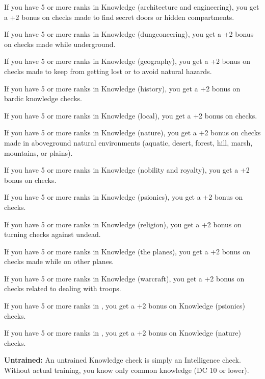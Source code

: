 If you have 5 or more ranks in Knowledge (architecture and engineering), you get a +2 bonus on  checks made to find secret doors or hidden compartments.

If you have 5 or more ranks in Knowledge (dungeoneering), you get a +2 bonus on  checks made while underground.

If you have 5 or more ranks in Knowledge (geography), you get a +2 bonus on  checks made to keep from getting lost or to avoid natural hazards.

If you have 5 or more ranks in Knowledge (history), you get a +2 bonus on bardic knowledge checks.

If you have 5 or more ranks in Knowledge (local), you get a +2 bonus on  checks.

If you have 5 or more ranks in Knowledge (nature), you get a +2 bonus on  checks made in aboveground natural environments (aquatic, desert, forest, hill, marsh, mountains, or plains).

If you have 5 or more ranks in Knowledge (nobility and royalty), you get a +2 bonus on  checks.

If you have 5 or more ranks in Knowledge (psionics), you get a +2 bonus on  checks.

If you have 5 or more ranks in Knowledge (religion), you get a +2 bonus on turning checks against undead.

If you have 5 or more ranks in Knowledge (the planes), you get a +2 bonus on  checks made while on other planes.

If you have 5 or more ranks in Knowledge (warcraft), you get a +2 bonus on  checks related to dealing with troops.

If you have 5 or more ranks in , you get a +2 bonus on Knowledge (psionics) checks.

If you have 5 or more ranks in , you get a +2 bonus on Knowledge (nature) checks.

\textbf{Untrained:} An untrained Knowledge check is simply an Intelligence check. Without actual training, you know only common knowledge (DC 10 or lower).


